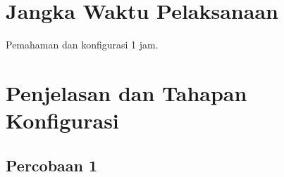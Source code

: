 \section{Jangka Waktu Pelaksanaan}
Pemahaman dan konfigurasi 1 jam.

\section{Penjelasan dan Tahapan Konfigurasi}

\subsection{Percobaan 1}

